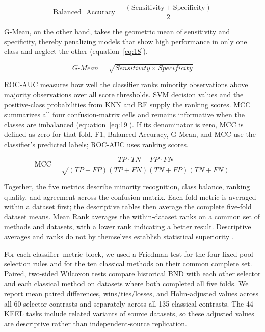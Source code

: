 \documentclass[pdflatex]{sn-jnl}
\begin{document}
\begin{equation}\label{eq:17}
\text{Balanced}\text{\ }\text{Accuracy} = \frac{(\text{Sensitivity} + \text{Specificity})}{2}
\end{equation}

G-Mean, on the other hand, takes the geometric mean of sensitivity and specificity, thereby penalizing models that show high performance in only one class and neglect the other (equation~\eqref{eq:18}).

\begin{equation}\label{eq:18}
G\text{-}Mean = \sqrt{Sensitivity \times Specificity}
\end{equation}

ROC-AUC measures how well the classifier ranks minority observations above majority observations over all score thresholds. SVM decision values and the positive-class probabilities from KNN and RF supply the ranking scores. MCC summarizes all four confusion-matrix cells and remains informative when the classes are imbalanced (equation~\eqref{eq:19}). If its denominator is zero, MCC is defined as zero for that fold. F1, Balanced Accuracy, G-Mean, and MCC use the classifier's predicted labels; ROC-AUC uses ranking scores.

\begin{equation}\label{eq:19}
\mathrm{MCC}=\frac{TP\cdot TN-FP\cdot FN}
{\sqrt{(TP+FP)(TP+FN)(TN+FP)(TN+FN)}}
\end{equation}

Together, the five metrics describe minority recognition, class balance, ranking quality, and agreement across the confusion matrix. Each fold metric is averaged within a dataset first; the descriptive tables then average the complete five-fold dataset means. Mean Rank averages the within-dataset ranks on a common set of methods and datasets, with a lower rank indicating a better result. Descriptive averages and ranks do not by themselves establish statistical superiority \cite{ref47} \cite{ref48}.

For each classifier--metric block, we used a Friedman test for the four fixed-pool selection rules and for the ten classical methods on their common complete set. Paired, two-sided Wilcoxon tests compare historical BND with each other selector and each classical method on datasets where both completed all five folds. We report mean paired differences, wins/ties/losses, and Holm-adjusted values across all 60 selector contrasts and separately across all 135 classical contrasts. The 44 KEEL tasks include related variants of source datasets, so these adjusted values are descriptive rather than independent-source replication.
\end{document}
